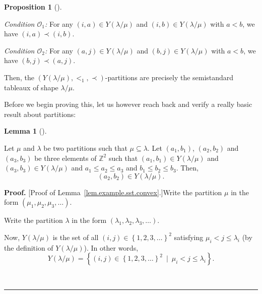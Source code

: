 \documentclass[numbers=enddot,12pt,final,onecolumn,notitlepage,abstracton]{scrartcl}
\theoremstyle{definition}
\newtheorem{lem}[theo]{Lemma}
\newenvironment{lemma}[1][]
{\begin{lem}[#1]\begin{leftbar}}
{\end{leftbar}\end{lem}}
\newtheorem{prop}[theo]{Proposition}
\newenvironment{proposition}[1][]
{\begin{prop}[#1]\begin{leftbar}}
{\end{leftbar}\end{prop}}
\newenvironment{proof}[1][Proof]{\noindent\textbf{#1.} }{\ \rule{0.5em}{0.5em}}
\newenvironment{verlong}{}{}
\begin{document}
\begin{verlong}
\begin{footnotesize}
\begin{proposition}
\textit{Condition $\mathcal{O}$}$_{1}$\textit{:} For any $\left(  i,a\right)
\in Y\left(  \lambda/\mu\right)  $ and $\left(  i,b\right)  \in Y\left(
\lambda/\mu\right)  $ with $a<b$, we have $\left(  i,a\right)  \prec\left(
i,b\right)  $.

\textit{Condition $\mathcal{O}$}$_{2}$\textit{:} For any $\left(  a,j\right)
\in Y\left(  \lambda/\mu\right)  $ and $\left(  b,j\right)  \in Y\left(
\lambda/\mu\right)  $ with $a<b$, we have $\left(  b,j\right)  \prec\left(
a,j\right)  $.

Then, the $\left(  Y\left(  \lambda/\mu\right)  ,<_{1},\prec\right)
$-partitions are precisely the semistandard tableaux of shape $\lambda/\mu$.
\end{proposition}

Before we begin proving this, let us however reach back and verify a really
basic result about partitions:

\begin{lemma}
\label{lem.example.sst.convex}Let $\mu$ and $\lambda$ be two partitions such
that $\mu\subseteq\lambda$. Let $\left(  a_{1} ,b_{1}\right)  $, $\left(
a_{2},b_{2}\right)  $ and $\left(  a_{3},b_{3}\right)  $ be three elements of
$\mathbb{Z}^{2}$ such that $\left(  a_{1},b_{1}\right)  \in Y\left(
\lambda/\mu\right)  $ and $\left(  a_{3},b_{3}\right)  \in Y\left(
\lambda/\mu\right)  $ and $a_{1}\leq a_{2}\leq a_{3}$ and $b_{1}\leq b_{2}\leq
b_{3}$. Then,
\begin{equation}
\left(  a_{2},b_{2}\right)  \in Y\left(  \lambda/\mu\right)  .
\label{pf.prop.example.sst.gen.2}%
\end{equation}

\end{lemma}

\begin{proof}
[Proof of Lemma~\ref{lem.example.sst.convex}.]Write the partition $\mu$ in the
form $\left(  \mu_{1},\mu_{2},\mu_{3},\ldots\right)  $.


Write the partition $\lambda$ in the form $\left(  \lambda_{1},\lambda
_{2},\lambda_{3},\ldots\right)  $.


Now, $Y\left(  \lambda/\mu\right)  $ is the set of all $\left(  i,j\right)
\in\left\{  1,2,3,\ldots\right\}  ^{2}$ satisfying $\mu_{i}<j\leq\lambda_{i}$
(by the definition of $Y\left(  \lambda/\mu\right)  $). In other words,%
\[
Y\left(  \lambda/\mu\right)  =\left\{  \left(  i,j\right)  \in\left\{
1,2,3,\ldots\right\}  ^{2}\ \mid\ \mu_{i}<j\leq\lambda_{i}\right\}  .
\]



\end{proof}
\end{footnotesize}
\end{verlong}
\end{document}
